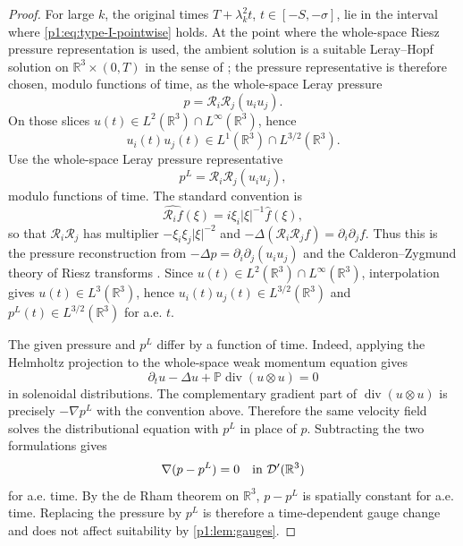 \documentclass[11pt]{amsart}
\theoremstyle{plain}
\theoremstyle{definition}
\theoremstyle{remark}
\numberwithin{equation}{section}
\newcommand{\R}{\mathbb R}
\newcommand{\divergence}{\operatorname{div}}
\begin{document}
\begin{proof}
For large \(k\), the original times \(T+\lambda_k^2t\), \(t\in[-S,-\sigma]\),
lie in the interval where \eqref{p1:eq:type-I-pointwise} holds.  At the
point where the whole-space Riesz pressure representation is used, the
ambient solution is a suitable Leray--Hopf solution on
\(\R^3\times(0,T)\) in the sense of
; the pressure representative is
therefore chosen, modulo functions of time, as the whole-space Leray
pressure
\[
   p=\mathcal R_i\mathcal R_j(u_i u_j) .
\]
On those slices
\(u(t)\in L^2(\R^3)\cap L^\infty(\R^3)\), hence
\[
   u_i(t)u_j(t)\in L^1(\R^3)\cap L^{3/2}(\R^3).
\]
Use the whole-space Leray pressure representative
\[
   p^L=\mathcal R_i\mathcal R_j(u_i u_j),
\]
modulo functions of time.  The standard convention is
\[
   \widehat{\mathcal R_i f}(\xi)=i\xi_i|\xi|^{-1}\widehat f(\xi),
\]
so that \(\mathcal R_i\mathcal R_j\) has multiplier
\(-\xi_i\xi_j|\xi|^{-2}\) and
\(-\Delta(\mathcal R_i\mathcal R_j f)=\partial_i\partial_jf\).  Thus this is
the pressure reconstruction from
\(-\Delta p=\partial_i\partial_j(u_i u_j)\) and the Calderon--Zygmund theory
of Riesz transforms \cite{Stein1970,Sohr2001}.  Since
\(u(t)\in L^2(\R^3)\cap L^\infty(\R^3)\), interpolation gives
\(u(t)\in L^3(\R^3)\), hence \(u_i(t)u_j(t)\in L^{3/2}(\R^3)\) and
\(p^L(t)\in L^{3/2}(\R^3)\) for a.e. \(t\).

The given pressure and \(p^L\) differ by a function of time.  Indeed, applying
the Helmholtz projection to the whole-space weak momentum equation gives
\[
   \partial_tu-\Delta u+\mathbb P\divergence(u\otimes u)=0
\]
in solenoidal distributions.  The complementary gradient part of
\(\divergence(u\otimes u)\) is precisely
\(-\nabla p^L\) with the convention above.  Therefore the same velocity field
solves the distributional equation with \(p^L\) in place of \(p\).  Subtracting
the two formulations gives
\[
   \nabla(p-p^L)=0
   \quad\hbox{in }\mathcal D'(\R^3)
\]
for a.e. time.  By the de Rham theorem on \(\R^3\), \(p-p^L\) is spatially
constant for a.e. time.  Replacing the pressure by \(p^L\) is therefore a
time-dependent gauge change and does not affect suitability by
\cref{p1:lem:gauges}.


\end{proof}
\end{document}
